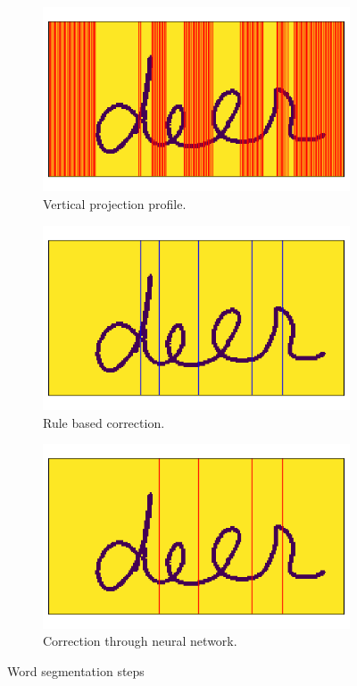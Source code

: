 \documentclass{article}
\begin{document}
\begin{figure}
    \begin{subfigure}{0.33\textwidth}
    \centering
    \includegraphics[width=\textwidth]{images/vpp}
    \caption*{Vertical projection profile.}
    \end{subfigure}
    \begin{subfigure}{0.33\textwidth}
    \centering
    \includegraphics[width=\textwidth]{images/rules}
    \caption*{Rule based correction.}
    \end{subfigure}
    \begin{subfigure}{0.33\textwidth}
    \centering
    \includegraphics[width=\textwidth]{images/nn}
    \caption*{Correction through neural network.}
    \end{subfigure}
    \caption{Word segmentation steps}
    \label{fig:char_segm}
\end{figure}
\end{document}
